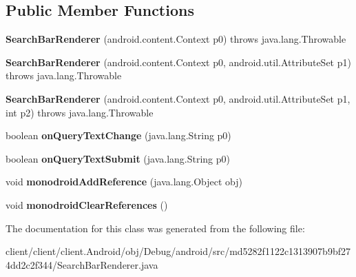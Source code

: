 \subsection*{Public Member Functions}
\begin{DoxyCompactItemize}
\item 
\hypertarget{classmd5282f1122c1313907b9bf274dd2c2f344_1_1SearchBarRenderer_afcc7f18eb3539d7ed58dc4e6623b2bbf}{}{\bfseries Search\+Bar\+Renderer} (android.\+content.\+Context p0)  throws java.\+lang.\+Throwable 	\label{classmd5282f1122c1313907b9bf274dd2c2f344_1_1SearchBarRenderer_afcc7f18eb3539d7ed58dc4e6623b2bbf}

\item 
\hypertarget{classmd5282f1122c1313907b9bf274dd2c2f344_1_1SearchBarRenderer_ad8283b317d0557481b4b6425a8907d73}{}{\bfseries Search\+Bar\+Renderer} (android.\+content.\+Context p0, android.\+util.\+Attribute\+Set p1)  throws java.\+lang.\+Throwable 	\label{classmd5282f1122c1313907b9bf274dd2c2f344_1_1SearchBarRenderer_ad8283b317d0557481b4b6425a8907d73}

\item 
\hypertarget{classmd5282f1122c1313907b9bf274dd2c2f344_1_1SearchBarRenderer_a5bcd2ea967b4847325194543562d8bd2}{}{\bfseries Search\+Bar\+Renderer} (android.\+content.\+Context p0, android.\+util.\+Attribute\+Set p1, int p2)  throws java.\+lang.\+Throwable 	\label{classmd5282f1122c1313907b9bf274dd2c2f344_1_1SearchBarRenderer_a5bcd2ea967b4847325194543562d8bd2}

\item 
\hypertarget{classmd5282f1122c1313907b9bf274dd2c2f344_1_1SearchBarRenderer_a7b0f01cafaf49e20193a1c250c2e272a}{}boolean {\bfseries on\+Query\+Text\+Change} (java.\+lang.\+String p0)\label{classmd5282f1122c1313907b9bf274dd2c2f344_1_1SearchBarRenderer_a7b0f01cafaf49e20193a1c250c2e272a}

\item 
\hypertarget{classmd5282f1122c1313907b9bf274dd2c2f344_1_1SearchBarRenderer_a24f9858dbf2cf6e768406c9e3c292e5d}{}boolean {\bfseries on\+Query\+Text\+Submit} (java.\+lang.\+String p0)\label{classmd5282f1122c1313907b9bf274dd2c2f344_1_1SearchBarRenderer_a24f9858dbf2cf6e768406c9e3c292e5d}

\item 
\hypertarget{classmd5282f1122c1313907b9bf274dd2c2f344_1_1SearchBarRenderer_a202895227f445666788af766a0ef4513}{}void {\bfseries monodroid\+Add\+Reference} (java.\+lang.\+Object obj)\label{classmd5282f1122c1313907b9bf274dd2c2f344_1_1SearchBarRenderer_a202895227f445666788af766a0ef4513}

\item 
\hypertarget{classmd5282f1122c1313907b9bf274dd2c2f344_1_1SearchBarRenderer_aebc9c04b5bd575816239894a093e7ba2}{}void {\bfseries monodroid\+Clear\+References} ()\label{classmd5282f1122c1313907b9bf274dd2c2f344_1_1SearchBarRenderer_aebc9c04b5bd575816239894a093e7ba2}

\end{DoxyCompactItemize}


The documentation for this class was generated from the following file\+:\begin{DoxyCompactItemize}
\item 
client/client/client.\+Android/obj/\+Debug/android/src/md5282f1122c1313907b9bf274dd2c2f344/Search\+Bar\+Renderer.\+java\end{DoxyCompactItemize}
